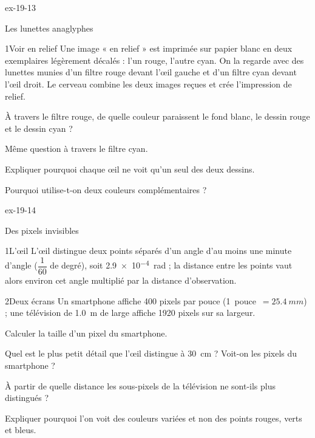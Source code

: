 \begin{blocLivre}{ex-19-13}
\begin{exercice}[3]{Les lunettes anaglyphes}
\begin{docu}{1}{Voir en relief}
Une image « en relief » est imprimée sur papier blanc en deux exemplaires légèrement décalés : l'un rouge, l'autre cyan. On la regarde
avec des lunettes munies d'un filtre rouge devant l'œil gauche et d'un filtre cyan devant l'œil droit. Le cerveau combine les deux
images reçues et crée l'impression de relief.
\end{docu}
\begin{questions}
\item À travers le filtre rouge, de quelle couleur paraissent le fond blanc, le dessin rouge et le dessin cyan ?
\item Même question à travers le filtre cyan.
\item \initiative Expliquer pourquoi chaque œil ne voit qu'un seul des deux dessins.
\item Pourquoi utilise-t-on deux couleurs complémentaires ?
\end{questions}
\end{exercice}
\end{blocLivre}
\begin{blocLivre}{ex-19-14}
\begin{exercice}[3]{Des pixels invisibles}
\begin{docu}{1}{L'œil}
L'œil distingue deux points séparés d'un angle d'au moins une minute d'angle ($\dfrac{1}{60}$ de degré), soit \qty{2,9e-4}{rad} ; la distance entre les
points vaut alors environ cet angle multiplié par la distance d'observation.
\end{docu}
\begin{docu}{2}{Deux écrans}
Un smartphone affiche 400 pixels par pouce (\qty{1}{pouce}~$=\qty{25,4}{mm}$) ; une télévision de \qty{1,0}{m} de large affiche 1920 pixels sur sa largeur.
\end{docu}
\begin{questions}
\item Calculer la taille d'un pixel du smartphone.
\item Quel est le plus petit détail que l'œil distingue à \qty{30}{cm} ? Voit-on les pixels du smartphone ?
\item \initiative À partir de quelle distance les sous-pixels de la télévision ne sont-ils plus distingués ?
\item Expliquer pourquoi l'on voit des couleurs variées et non des points rouges, verts et bleus.
\end{questions}
\end{exercice}
\end{blocLivre}
